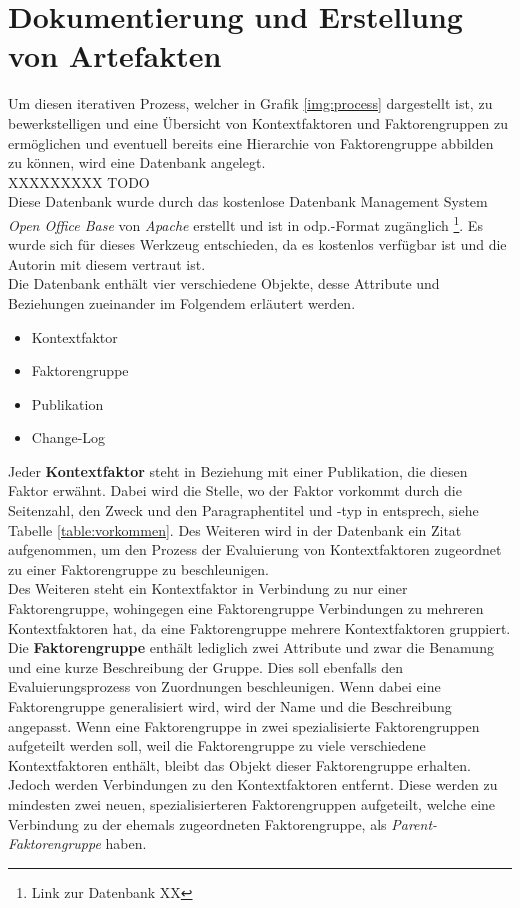 \section{Dokumentierung und Erstellung von Artefakten}
Um diesen iterativen Prozess, welcher in Grafik \ref{img:process} dargestellt ist, zu bewerkstelligen und eine Übersicht von Kontextfaktoren und Faktorengruppen zu ermöglichen und eventuell bereits eine Hierarchie von Faktorengruppe abbilden zu können, wird eine Datenbank angelegt. \\

XXXXXXXXX TODO \\


Diese Datenbank wurde durch das kostenlose Datenbank Management System \textit{Open Office Base} von \textit{Apache} erstellt und ist in odp.-Format zugänglich \footnote{Link zur Datenbank XX}. Es wurde sich für dieses Werkzeug entschieden, da es kostenlos verfügbar ist und die Autorin mit diesem vertraut ist.\\

Die Datenbank enthält vier verschiedene Objekte, desse Attribute und Beziehungen zueinander im Folgendem erläutert werden.
\begin{itemize}
    \item Kontextfaktor
    \item Faktorengruppe
    \item Publikation
    \item Change-Log
\end{itemize}

Jeder \textbf{Kontextfaktor} steht in Beziehung mit einer Publikation, die diesen Faktor erwähnt. Dabei wird die Stelle, wo der Faktor vorkommt durch die Seitenzahl, den Zweck und den Paragraphentitel und -typ in entsprech, siehe Tabelle \ref{table:vorkommen}. 
Des Weiteren wird in der Datenbank ein Zitat aufgenommen, um den Prozess der Evaluierung von Kontextfaktoren zugeordnet zu einer Faktorengruppe zu beschleunigen. \\ 

Des Weiteren steht ein Kontextfaktor in Verbindung zu nur einer Faktorengruppe, wohingegen eine Faktorengruppe Verbindungen zu mehreren Kontextfaktoren hat, da eine Faktorengruppe mehrere Kontextfaktoren gruppiert. \\

Die \textbf{Faktorengruppe} enthält lediglich zwei Attribute und zwar die Benamung und eine kurze Beschreibung der Gruppe. Dies soll ebenfalls den Evaluierungsprozess von Zuordnungen beschleunigen. 
Wenn dabei eine Faktorengruppe generalisiert wird, wird der Name und die Beschreibung angepasst. Wenn eine Faktorengruppe in zwei spezialisierte Faktorengruppen aufgeteilt werden soll, weil die Faktorengruppe zu viele verschiedene Kontextfaktoren enthält, bleibt das Objekt dieser Faktorengruppe erhalten. Jedoch werden Verbindungen zu den Kontextfaktoren entfernt. Diese werden zu mindesten zwei neuen, spezialisierteren Faktorengruppen aufgeteilt, welche eine Verbindung zu der ehemals zugeordneten Faktorengruppe, als \textit{Parent-Faktorengruppe} haben. \\

